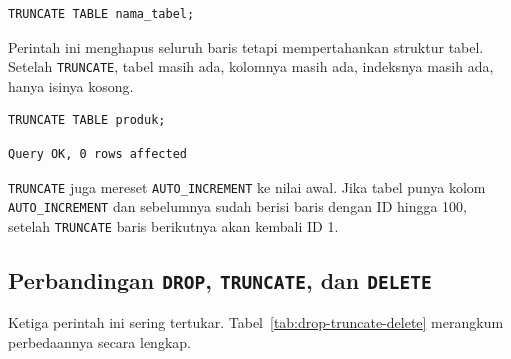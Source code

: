\documentclass[11pt,a4paper]{article}
\begin{document}
\begin{lstlisting}[style=code]
TRUNCATE TABLE nama_tabel;
\end{lstlisting}

Perintah ini menghapus seluruh baris tetapi mempertahankan struktur tabel. Setelah \texttt{TRUNCATE}, tabel masih ada, kolomnya masih ada, indeksnya masih ada, hanya isinya kosong.

\begin{lstlisting}[style=code]
TRUNCATE TABLE produk;
\end{lstlisting}

\begin{lstlisting}[style=out]
Query OK, 0 rows affected
\end{lstlisting}

\texttt{TRUNCATE} juga mereset \texttt{AUTO\_INCREMENT} ke nilai awal. Jika tabel punya kolom \texttt{AUTO\_INCREMENT} dan sebelumnya sudah berisi baris dengan ID hingga 100, setelah \texttt{TRUNCATE} baris berikutnya akan kembali ID 1.

\subsection{Perbandingan \texttt{DROP}, \texttt{TRUNCATE}, dan \texttt{DELETE}}

Ketiga perintah ini sering tertukar. Tabel~\ref{tab:drop-truncate-delete} merangkum perbedaannya secara lengkap.
\end{document}
